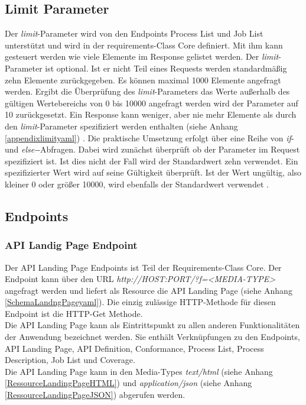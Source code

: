 \subsection{Limit Parameter}
Der \textit{limit}-Parameter wird von den Endpoints Process List und Job List unterstützt
und wird in der requirements-Class Core definiert. Mit ihm kann gesteuert werden wie viele Elemente im Response gelistet werden. 
Der \textit{limit}-Parameter ist optional. Ist er nicht Teil eines Requests werden standardmäßig zehn Elemente zurückgegeben. Es können maximal 1000 Elemente angefragt werden.
Ergibt die Überprüfung des \textit{limit}-Parameters das Werte außerhalb des gültigen Wertebereichs von 0 bis 10000 angefragt werden wird der Parameter auf 10 zurückgesetzt. 
Ein Response kann weniger, aber nie mehr Elemente als durch den \textit{limit}-Parameter spezifiziert werden enthalten (siehe Anhang \ref{appendixlimityaml}) 
\cite{ogc_api_processes_core}. Die praktische Umsetzung erfolgt über eine Reihe von \textit{if}- und \textit{else-}-Abfragen. Dabei wird zunächst überprüft ob 
der Parameter im Request spezifiziert ist. Ist dies nicht der Fall wird der Standardwert zehn verwendet. Ein spezifizierter Wert wird auf seine Gültigkeit überprüft. 
Ist der Wert ungültig, also kleiner 0 oder größer 10000, wird ebenfalls der Standardwert verwendet \cite{ogc_api_processes_core}.

\subsection{Endpoints}
\subsubsection{API Landig Page Endpoint}
Der API Landing Page Endpoints ist Teil der Requirements-Class Core.
Der Endpoint kann über den URL \textit{http://HOST:PORT/?f=<MEDIA-TYPE>} angefragt werden und liefert als Resource die 
API Landing Page (siehe Anhang \ref{SchemaLandngPageyaml}). 
Die einzig zulässige HTTP-Methode für diesen Endpoint ist die HTTP-Get Methode.\\ 
Die API Landing Page kann als Eintrittspunkt zu allen anderen Funktionalitäten der Anwendung bezeichnet werden. Sie enthält Verknüpfungen zu den Endpoints, 
API Landing Page, API Definition, Conformance, Process List, Process Description, Job List und Coverage.\\
Die API Landing Page kann in den Media-Types \textit{text/html} (siehe Anhang \ref{RessourceLandingPageHTML}) und \textit{application/json} 
(siehe Anhang \ref{RessourceLandingPageJSON}) abgerufen werden. \\


